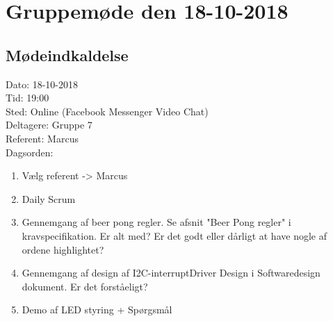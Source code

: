 \section{Gruppemøde den 18-10-2018}
\subsection{Mødeindkaldelse}
Dato: 18-10-2018
\\Tid: 19:00
\\Sted: Online (Facebook Messenger Video Chat)
\\Deltagere: Gruppe 7
\\Referent: Marcus
\\Dagsorden:
\begin{enumerate}
    \item Vælg referent -> Marcus
    \item Daily Scrum
    \item Gennemgang af beer pong regler. Se afsnit "Beer Pong regler" i kravspecifikation. Er alt med? Er det godt eller dårligt at have nogle af ordene highlightet?
    \item Gennemgang af design af I2C-interruptDriver Design i Softwaredesign dokument. Er det forståeligt?
    \item Demo af LED styring + Spørgsmål
\end{enumerate}

